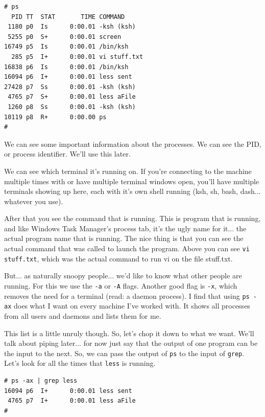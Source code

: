 {\tt \begin{verbatim}
# ps    
  PID TT  STAT       TIME COMMAND
 1180 p0  Is      0:00.01 -ksh (ksh)
 5255 p0  S+      0:00.01 screen
16749 p5  Is      0:00.01 /bin/ksh
  285 p5  I+      0:00.01 vi stuff.txt
16838 p6  Is      0:00.01 /bin/ksh
16094 p6  I+      0:00.01 less sent
27428 p7  Ss      0:00.01 -ksh (ksh)
 4765 p7  S+      0:00.01 less aFile
 1260 p8  Ss      0:00.01 -ksh (ksh)
10119 p8  R+      0:00.00 ps
# 
\end{verbatim}
}

We can see some important information about the processes. We can see
the PID, or process identifier. We'll use this later.

We can see which terminal it's running on. If you're connecting to the machine multiple times
with or have multiple terminal windows open, you'll have multiple terminals showing up here, each with it's own 
shell running (ksh, sh, bash, dash... whatever you use).

After that you see the command that is running.  This is program that is running, and like Windows
Task Manager's process tab, it's the ugly name for it... the actual program name that is running. The nice 
thing is that you can see the actual command that was called to launch the program. Above you can see {\tt vi stuff.txt}, 
which was the actual command to run vi on the file stuff.txt.

But... as naturally snoopy people... we'd like to know what other people are running.
For this we use the {\tt -a} or {\tt -A} flags. Another good flag is {\tt -x}, which 
removes the need for a terminal (read: a daemon process). I find that using {\tt ps -ax} 
does what I want on every machine I've worked with. It shows all processes from all users
and daemons and lists them for me. 

This list is a little unruly though. So, let's chop it down to what we want. 
We'll talk about piping later...
 for now just say that the output 
of one program can be the input to the next. So, we can pass the output of 
{\tt ps} to the input of {\tt grep}. Let's look for all the times that {\tt less}
is running.
{\begin{verbatim}
# ps -ax | grep less
16094 p6  I+      0:00.01 less sent
 4765 p7  I+      0:00.01 less aFile
# 
\end{verbatim}
}


